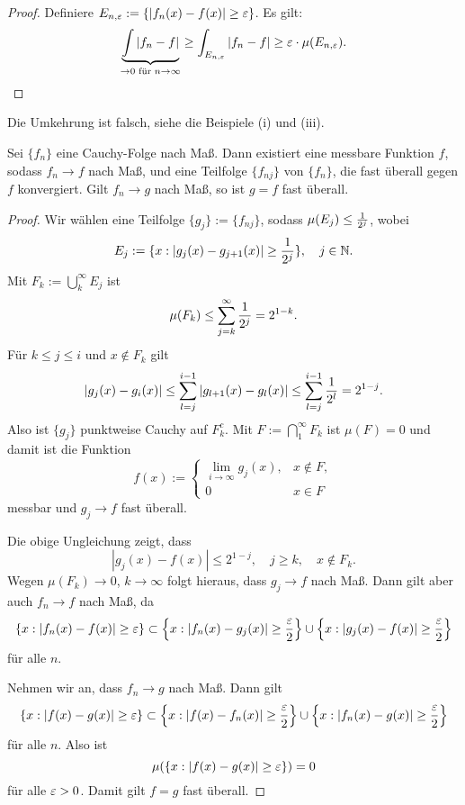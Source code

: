 \documentclass[
 a4paper,
 12pt,
 parskip=half
 ]{scrreprt}
\theoremstyle{plain}
\theoremstyle{definition}
\numberwithin{equation}{section}
\begin{document}
\begin{proof}
 Definiere $E_{n,\varepsilon} := \{ | f_n(x) - f(x) | \ge \varepsilon \}$. Es gilt:
 \[ \underbrace{\int | f_n - f |}_{\to 0 \text{ für } n \to \infty} \ge \int_{E_{n,\varepsilon}} | f_n - f | \ge \varepsilon \cdot \mu( E_{n,\varepsilon} ). \qedhere \]
\end{proof}

Die Umkehrung ist falsch, siehe die Beispiele (i) und (iii).

\begin{thm}
 Sei $\{ f_n \}$ eine Cauchy-Folge nach Maß. Dann existiert eine messbare Funktion $f$, sodass $f_n \to f$ nach Maß, und eine Teilfolge $\{ f_{nj} \}$ von $\{ f_n \}$, die fast überall gegen $f$ konvergiert. Gilt $f_n \to g$ nach Maß, so ist $g = f$ fast überall.
\end{thm}

\begin{proof}
 Wir wählen eine Teilfolge $\{ g_j \} := \{ f_{nj} \}$, sodass $\mu( E_j ) \le \frac{1}{2^j}$, wobei 
 \[ E_j := \{ x : | g_j(x) - g_{j+1}(x) | \ge \frac{1}{2^j} \}, \quad j \in \mathbb{N}. \]
 Mit $F_k := \bigcup_k^\infty E_j$ ist
 \[ \mu( F_k ) \le \sum_{j=k}^\infty \frac{1}{2^j} = 2^{1-k}. \]
 Für $k \le j \le i$ und $x \notin F_k$ gilt
 \[ | g_j(x) - g_i(x) | \le \sum_{l=j}^{i-1} | g_{l+1}(x) - g_l(x) | \le \sum_{l=j}^{i-1} \frac{1}{2^l} = 2^{1-j}. \]
 Also ist $\{g_j\}$ punktweise Cauchy auf $F_k^c$. Mit $F := \bigcap_1^\infty F_k$ ist $\mu(F) = 0$ und damit ist die Funktion
 \[ f(x) := \begin{cases} \lim_{i \to \infty} g_j(x), &x \notin F, \\ 0 &x \in F \end{cases} \]
 messbar und $g_j \to f$ fast überall.
 
 Die obige Ungleichung zeigt, dass
 \[ | g_j(x) - f(x) | \le 2^{1-j}, \quad j \ge k, \quad x \notin F_k. \]
 Wegen $\mu(F_k) \to 0$, $k \to \infty$ folgt hieraus, dass $g_j \to f$ nach Maß. Dann gilt aber auch $f_n \to f$ nach Maß, da
 \[ \{ x : | f_n(x) - f(x) | \ge \varepsilon \} \subset \left\{ x : | f_n(x) - g_j(x) | \ge \frac{\varepsilon}{2} \right\} \cup \left\{ x : | g_j(x) - f(x) | \ge \frac{\varepsilon}{2} \right\} \]
 für alle $n$.
 
 Nehmen wir an, dass $f_n \to g$ nach Maß. Dann gilt
 \[ \{ x : | f(x) - g(x) | \ge \varepsilon \} \subset \left\{ x : | f(x) - f_n(x) | \ge \frac{\varepsilon}{2} \right\} \cup \left\{ x : | f_n(x) - g(x) | \ge \frac{\varepsilon}{2} \right\} \]
 für alle $n$. Also ist
 \[ \mu( \{ x : | f(x) - g(x) | \ge \varepsilon \} ) = 0 \]
 für alle $\varepsilon > 0$. Damit gilt $f = g$ fast überall.
\end{proof}
\end{document}
